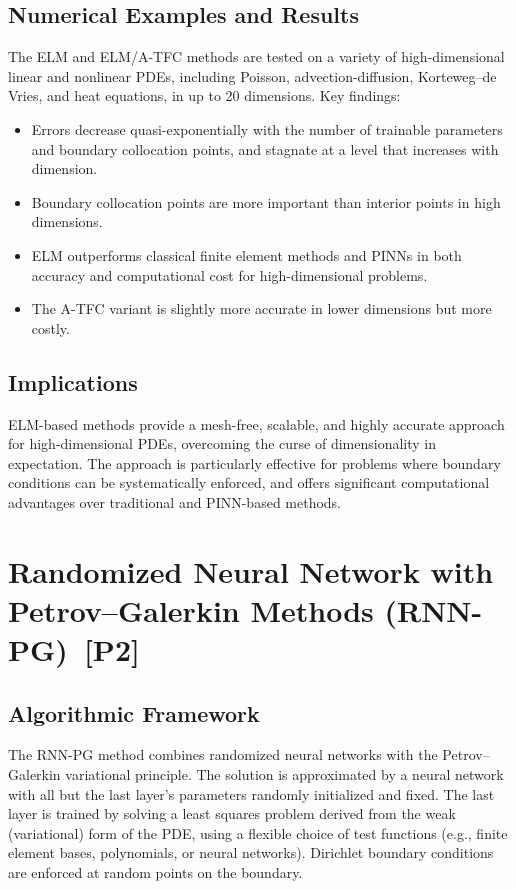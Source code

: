 \documentclass[11pt]{article}
\begin{document}
\subsection{Numerical Examples and Results}
The ELM and ELM/A-TFC methods are tested on a variety of high-dimensional linear and nonlinear PDEs, including Poisson, advection-diffusion, Korteweg–de Vries, and heat equations, in up to 20 dimensions. Key findings:
\begin{itemize}
    \item Errors decrease quasi-exponentially with the number of trainable parameters and boundary collocation points, and stagnate at a level that increases with dimension.
    \item Boundary collocation points are more important than interior points in high dimensions.
    \item ELM outperforms classical finite element methods and PINNs in both accuracy and computational cost for high-dimensional problems.
    \item The A-TFC variant is slightly more accurate in lower dimensions but more costly.
\end{itemize}

\subsection{Implications}
ELM-based methods provide a mesh-free, scalable, and highly accurate approach for high-dimensional PDEs, overcoming the curse of dimensionality in expectation. The approach is particularly effective for problems where boundary conditions can be systematically enforced, and offers significant computational advantages over traditional and PINN-based methods.

\section{Randomized Neural Network with Petrov–Galerkin Methods (RNN-PG)~[P2]}
\subsection{Algorithmic Framework}
The RNN-PG method combines randomized neural networks with the Petrov–Galerkin variational principle. The solution is approximated by a neural network with all but the last layer's parameters randomly initialized and fixed. The last layer is trained by solving a least squares problem derived from the weak (variational) form of the PDE, using a flexible choice of test functions (e.g., finite element bases, polynomials, or neural networks). Dirichlet boundary conditions are enforced at random points on the boundary.
\end{document}
